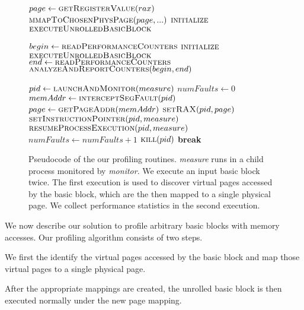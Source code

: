 \begin{figure}
\begin{algorithmic}

    \State $page \gets \Call{getRegisterValue}{rax}$
    \State $\Call{mmapToChosenPhysPage}{page, ...}$
    \State $\Call{initialize}{}$
    \State $\Call{executeUnrolledBasicBlock}{}$
    
    
    \State $begin \gets \Call{readPerformanceCounters}{}$
    \State $\Call{initialize}{}$
    \State $\Call{executeUnrolledBasicBlock}{}$
    \State $end \gets \Call{readPerformanceCounters}{}$
    \State $\Call{analyzeAndReportCounters}{begin, end}$
\EndFunction

    \State $pid \gets \Call{launchAndMonitor}{measure}$
    \State $numFaults \gets 0$
        \State $memAddr \gets \Call{interceptSegFault}{pid}$
            \State $page \gets \Call{getPageAddr}{memAddr}$
            \State $\Call{setRAX}{pid, page}$
            \State $\Call{setInstructionPointer}{pid, measure}$
            \State $\Call{resumeProcessExecution}{pid, measure}$
            \State $numFaults \gets numFaults + 1$
        \EndIf
            \State $\Call{kill}{pid}$
            \State \textbf{break}
        \EndIf
    \EndWhile
\EndFunction

\end{algorithmic}

\caption{Pseudocode of the our profiling routines. 
\textit{measure} runs in a child process monitored by
\textit{monitor}.
We execute an input basic block twice.
The first execution is used to discover virtual pages accessed
by the basic block, which are the then mapped to a single physical page.
We collect performance statistics in the second execution.}
\label{fig:code}
\end{figure}

We now describe our solution to profile arbitrary basic blocks with memory accesses.
Our profiling algorithm consists of two steps.
\begin{enumerate*}
\item We first the identify the virtual pages accessed by
the basic block 
and map those virtual pages to a single physical page.
\item After the appropriate mappings are created,
the unrolled basic block is then executed normally under
the new page mapping.
\end{enumerate*}

